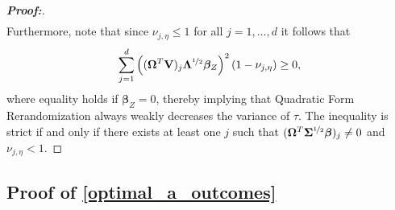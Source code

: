 \documentclass[11pt,twoside]{article}
\theoremstyle{definition}
\theoremstyle{remark}
\begin{document}
\begin{proof}[\textbf{Proof:}]
\begin{align*}
\end{align*}
Furthermore, note that since $\nu_{j, \eta} \leq 1$ for all $j = 1, \ldots, d$ it follows that 
\begin{align*}
    \sum^d_{j=1} \left((\mathbf{\Omega}^T   \mathbf{V})_j \mathbf{\Lambda}^{\nicefrac{1}{2}}  \bm{\beta}_Z \right)^2 (1 - \nu_{j, \eta}) \geq 0,
\end{align*}
where equality holds if $\bm{\beta}_Z = 0$, thereby implying that Quadratic Form Rerandomization always weakly decreases the variance of $\widehat{\tau}$. The inequality is strict if and only if there exists at least one $j$ such that $(\mathbf{\Omega}^T\mathbf{\Sigma}^{\nicefrac{1}{2}}\bm{\beta})_j\neq 0$ and $\nu_{j,\eta} < 1$.
\end{proof}


\subsection{Proof of \texorpdfstring{\cref{optimal_a_outcomes}}{Theorem 5}} \label{optimal_a_outcomes_proof}
\end{document}
